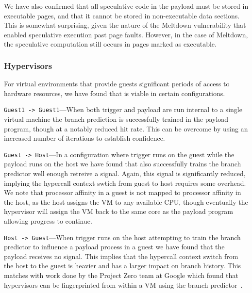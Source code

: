 We have also confirmed that all speculative code in the payload must be
stored in executable pages, and that it cannot be stored in non-executable data
sections. This is somewhat surprising, given the nature of the Meltdown
vulnerability that enabled speculative execution past page faults. However, in
the case of Meltdown, the speculative computation still occurs in pages marked
as executable.



\subsubsection{Hypervisors}
For virtual environments that provide guests significant periods of access to 
hardware resources, we have found that \speculake is viable in certain configurations. 

\texttt{Guest1 -> Guest1}---When both trigger and payload are run internal to a
single virtual machine the branch prediction is successfully trained in the
payload program, though at a notably reduced hit rate. This can be overcome by
using an increased number of iterations to establish confidence. 

\texttt{Guest -> Host}---In a configuration where trigger runs on the guest
while the payload runs on the host we have found that \speculake also
successfully trains the branch predictor well enough retreive a signal. Again,
this signal is significantly reduced, implying the hypercall context swtich from
guest to host requires some overhead. We note that processor affinity in a guest
is not mapped to processor affinity in the host, as the host assigns the VM to
any available CPU, though eventually the hypervisor will assign the VM back to
the same core as the payload program allowing progress to continue.

\texttt{Host -> Guest}---When trigger runs on the host attempting to train the
branch predictor to influence a payload process in a guest we have found that
the payload receives no signal. This implies that the hypercall context switch
from the host to the guest is heavier and has a larger impact on branch history.
This matches with work done by the Project Zero team at Google which found that
hypervisors can be fingerprinted from within a VM using the branch
predictor~\cite{project_zero}.

